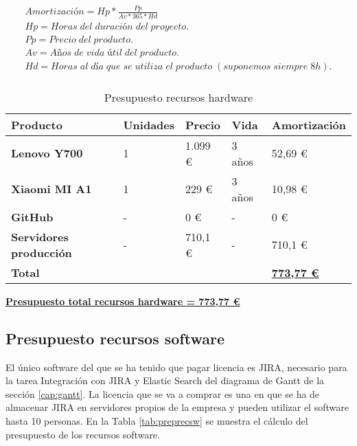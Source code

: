 \label{eq:amortizacion}
\begin{align*}
Amortización = Hp * \frac{Pp}{Av*365*Hd} \\
Hp = Horas \; del \; duración \; del \; proyecto. \\
Pp = Precio \; del \; producto. \\
Av = Años \; de \; vida \; útil \; del \; producto. \\
Hd = Horas \; al \; día \; que \; se \; utiliza \; el \; producto \; (suponemos \; siempre \; 8h). \\
\end{align*}

\begin{table}[H]\label{tab:preprechw}
	\centering
	\begin{tabular}{|l|l|l|l|l|}
		\hline
		\textbf{Producto}               & \textbf{Unidades} & \textbf{Precio} & \textbf{Vida} & \textbf{Amortización} \\ \hline
		\textbf{Lenovo Y700}            & 1                 & 1.099 € \cite{Tfg:ideapad} & 3 años        & 52,69 €               \\ \hline
		\textbf{Xiaomi MI A1}           & 1                 & 229 € \cite{Tfg:mia1}      & 3 años        & 10,98 €               \\ \hline
		\textbf{GitHub}                 & -                 & 0 €             & -             & 0 €                   \\ \hline
		\textbf{Servidores producción}  & -                 & 710,1 €         & -             & 710,1 €               \\ \hline
		\multicolumn{4}{|l|}{\textbf{Total}} & \textbf{\underline{773,77 €}}                                        \\ \hline
	\end{tabular}
	\caption{Presupuesto recursos hardware}
\end{table}

\textbf{\underline{Presupuesto total recursos hardware = 773,77 €}}

\subsection{Presupuesto recursos software}
El único software del que se ha tenido que pagar licencia es JIRA, necesario para la tarea Integración con JIRA y Elastic Search del diagrama de Gantt de la sección \ref{cap:gantt}. La licencia que se va a comprar es una en que se ha de almacenar JIRA en servidores propios de la empresa y pueden utilizar el software hasta 10 personas. En la Tabla \ref{tab:preprecsw} se muestra el cálculo del presupuesto de los recursos software.

